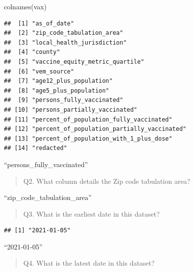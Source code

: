 \documentclass[
]{article}
\newenvironment{Shaded}{\begin{snugshade}}{\end{snugshade}}
\newcommand{\FunctionTok}[1]{\textcolor[rgb]{0.00,0.00,0.00}{#1}}
\newcommand{\NormalTok}[1]{#1}
\newcommand{\SpecialCharTok}[1]{\textcolor[rgb]{0.00,0.00,0.00}{#1}}
\begin{document}
\begin{Shaded}
\begin{Highlighting}[]
\FunctionTok{colnames}\NormalTok{(vax)}
\end{Highlighting}
\end{Shaded}

\begin{verbatim}
##  [1] "as_of_date"                                
##  [2] "zip_code_tabulation_area"                  
##  [3] "local_health_jurisdiction"                 
##  [4] "county"                                    
##  [5] "vaccine_equity_metric_quartile"            
##  [6] "vem_source"                                
##  [7] "age12_plus_population"                     
##  [8] "age5_plus_population"                      
##  [9] "persons_fully_vaccinated"                  
## [10] "persons_partially_vaccinated"              
## [11] "percent_of_population_fully_vaccinated"    
## [12] "percent_of_population_partially_vaccinated"
## [13] "percent_of_population_with_1_plus_dose"    
## [14] "redacted"
\end{verbatim}

``persons\_fully\_vaccinated''

\begin{quote}
Q2. What column details the Zip code tabulation area?
\end{quote}

``zip\_code\_tabulation\_area''

\begin{quote}
Q3. What is the earliest date in this dataset?
\end{quote}

\begin{Shaded}
\end{Shaded}

\begin{verbatim}
## [1] "2021-01-05"
\end{verbatim}

``2021-01-05''

\begin{quote}
Q4. What is the latest date in this dataset?
\end{quote}

\begin{Shaded}
\end{Shaded}
\end{document}

